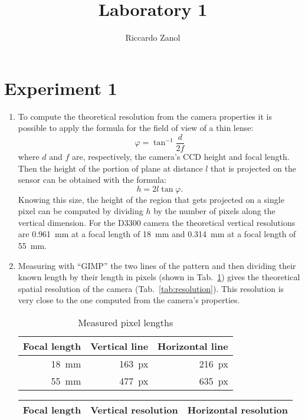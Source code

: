 \documentclass{article}
\author{Riccardo Zanol}
\title{Laboratory 1}
\begin{document}
\maketitle
\section*{Experiment 1}
\begin{enumerate}
\item To compute the theoretical resolution from the camera properties it is
possible to apply the formula for the field of view of a thin lense:
\begin{equation}
  \varphi = \tan^{-1}\frac{d}{2f}
  \label{eq:phi}
\end{equation}
where $d$ and $f$ are, respectively, the camera's CCD height and focal
length. Then the height of the portion of plane at distance $l$ that
is projected on the sensor can be obtained with the formula:
\begin{equation*}
  h = 2 l \tan \varphi .
\end{equation*}
Knowing this size, the height of the region that gets projected on a
single pixel can be computed by dividing $h$ by the number of pixels
along the vertical dimension. For the D3300 camera the theoretical
vertical resolutions are \SI{0.961}{\mm} at a focal length of
\SI{18}{\mm} and \SI{0.314}{\mm} at a focal length of \SI{55}{\mm}.
\item Measuring with ``GIMP'' the two lines of the pattern and then
  dividing their known length by their length in pixels (shown in
  Tab.~\ref{tab:pixel-lengths}) gives the theoretical spatial
  resolution of the camera (Tab.~\ref{tab:resolution}). This
  resolution is very close to the one computed from the camera's
  properties.
\begin{table}[h]
  \centering
  \begin{tabular}{rrr}
    Focal length & Vertical line & Horizontal line \\
    \hline
    \SI{18}{\mm} & \SI{163}{px} & \SI{216}{px} \\
    \SI{55}{\mm} & \SI{477}{px} & \SI{635}{px}
  \end{tabular}
  \caption{Measured pixel lengths}
  \label{tab:pixel-lengths}
\end{table}
\begin{table}[h]
  \centering
  \begin{tabular}{rrr}
    Focal length & Vertical resolution & Horizontal resolution \\
    \hline

\end{tabular}
\end{table}
\end{enumerate}
\end{document}
